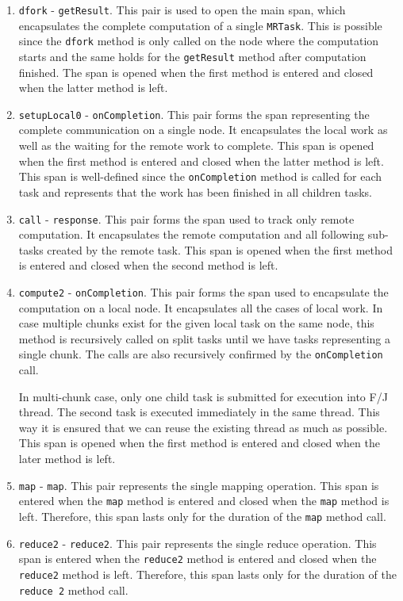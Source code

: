 \begin{enumerate}
	\item \texttt{dfork} - \texttt{getResult}. This pair is used to open the main span, which encapsulates the complete computation of a single \texttt{MRTask}. This is possible since the \texttt{dfork} method is only called on the node where the computation starts and the same holds for the \texttt{getResult} method after computation finished. The span is opened when the first method is entered and closed when the latter method is left.
		
	\item \texttt{setupLocal0} - \texttt{onCompletion}. This pair forms the span representing the complete communication on a single node. It encapsulates the local work as well as the waiting for the remote work to complete. This span is opened when the first method is entered and closed when the latter method is left. This span is well-defined since the \texttt{onCompletion} method is called for each task and represents that the work has been finished in all children tasks.
	
	\item \texttt{call} - \texttt{response}. This pair forms the span used to track only remote computation. It encapsulates the remote computation and all following sub-tasks created by the remote task. This span is opened when the first method is entered and closed when the second method is left.
	
	\item \texttt{compute2} - \texttt{onCompletion}. This pair forms the span used to encapsulate the computation on a local node. It encapsulates all the cases of local work. In case multiple chunks exist for the given local task on the same node, this method is recursively called on split tasks until we have tasks representing a single chunk. The calls are also recursively confirmed by the \texttt{onCompletion} call. 
	
	In multi-chunk case, only one child task is submitted for execution into F/J thread. The second task is executed immediately in the same thread. This way it is ensured that we can reuse the existing thread as much as possible. This span is opened when the first method is entered and closed when the later method is left.
	
	\item \texttt{map} - \texttt{map}. This pair represents the single mapping operation. This span is entered when the \texttt{map} method is entered and closed when the \texttt{map} method is left. Therefore, this span lasts only for the duration of the \texttt{map} method call.
	
	\item \texttt{reduce2} - \texttt{reduce2}. This pair represents the single reduce operation. This span is entered when the \texttt{reduce2} method is entered and closed when the \texttt{reduce2} method is left. Therefore, this span lasts only for the duration of the \texttt{reduce 2} method call.
\end{enumerate}


